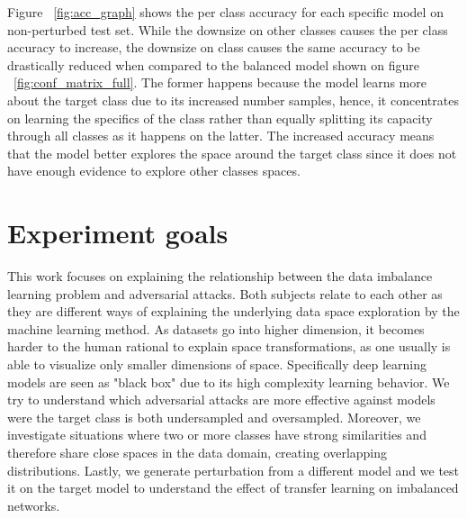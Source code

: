 Figure ~\ref{fig:acc_graph} shows the per class accuracy for each specific model on non-perturbed test set. While the downsize on other classes causes the per class accuracy to increase, the downsize on class causes the same accuracy to be drastically reduced when compared to the balanced model shown on figure ~\ref{fig:conf_matrix_full}. The former happens because the model learns more about the target class due to its increased number samples, hence, it concentrates on learning the specifics of the class rather than equally splitting its capacity through all classes as it happens on the latter. The increased accuracy means that the model better explores the space around the target class since it does not have enough evidence to explore other classes spaces.

\section{Experiment goals}
This work focuses on explaining the relationship between the data imbalance learning problem and adversarial attacks. Both subjects relate to each other as they are different ways of explaining the underlying data space exploration by the machine learning method. As datasets go into higher dimension, it becomes harder to the human rational to explain space transformations, as one usually is able to visualize only smaller dimensions of space. Specifically deep learning models are seen as "black box" due to its high complexity learning behavior. We try to understand which adversarial attacks are more effective against models were the target class is both undersampled and oversampled. Moreover, we investigate situations where two or more classes have strong similarities and therefore share close spaces in the data domain, creating overlapping distributions. Lastly, we generate perturbation from a different model and we test it on the target model to understand the effect of transfer learning on imbalanced networks.

